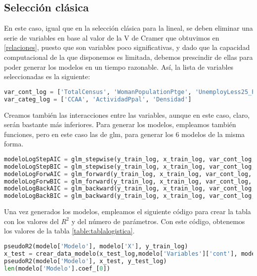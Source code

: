 \documentclass[a4paper,onecolumn]{extarticle}
\begin{document}
\begin{sloppypar}
\subsection{Selección clásica}\label{logclasica}
En este caso, igual que en la selección clásica para la lineal, se deben eliminar una serie de variables en base al valor de la V de Cramer que obtuvimos en
\ref{relaciones}, puesto que son variables poco significativas, y dado que la capacidad computacional de la que disponemos es limitada, debemos prescindir de 
ellas para poder generar los modelos en un tiempo razonable. Así, la lista de variables seleccionadas es la siguiente:
\begin{lstlisting}[language=Python]
var_cont_log = ['TotalCensus', 'WomanPopulationPtge', 'UnemployLess25_Ptge', 'Explotaciones', 'Unemploy25_40_Ptge', 'UnemployMore40_Ptge', 'AgricultureUnemploymentPtge']
var_categ_log = ['CCAA', 'ActividadPpal', 'Densidad']
\end{lstlisting}
Creamos también las interacciones entre las variables, aunque en este caso, claro, serán bastante más inferiores. Para generar los modelos, empleamos 
también funciones, pero en este caso las de glm, para generar los 6 modelos de la misma forma.
\begin{lstlisting}[language=Python]
modeloLogStepAIC = glm_stepwise(y_train_log, x_train_log, var_cont_log, var_categ_log, interacciones_unicas_log, 'AIC')
modeloLogStepBIC = glm_stepwise(y_train_log, x_train_log, var_cont_log, var_categ_log, interacciones_unicas_log, 'BIC')
modeloLogForwAIC = glm_forward(y_train_log, x_train_log, var_cont_log, var_categ_log, interacciones_unicas_log, 'AIC')
modeloLogForwBIC = glm_forward(y_train_log, x_train_log, var_cont_log, var_categ_log, interacciones_unicas_log, 'BIC')
modeloLogBackAIC = glm_backward(y_train_log, x_train_log, var_cont_log, var_categ_log, interacciones_unicas_log, 'AIC')
modeloLogBackBIC = glm_backward(y_train_log, x_train_log, var_cont_log, var_categ_log, interacciones_unicas_log, 'BIC')
\end{lstlisting}

Una vez generados los modelos, empleamos el siguiente código para crear la tabla con los valores del $R^2$ y del número de parámetros. Con este código,
obtenemos los valores de la tabla \ref{table:tablalogistica}.
\begin{lstlisting}[language=Python]
pseudoR2(modelo['Modelo'], modelo['X'], y_train_log)
x_test = crear_data_modelo(x_test_log,modelo['Variables']['cont'], modelo['Variables']['categ'], modelo['Variables']['inter'])
pseudoR2(modelo['Modelo'], x_test, y_test_log)
len(modelo['Modelo'].coef_[0])
\end{lstlisting}


\end{sloppypar}
\end{document}
